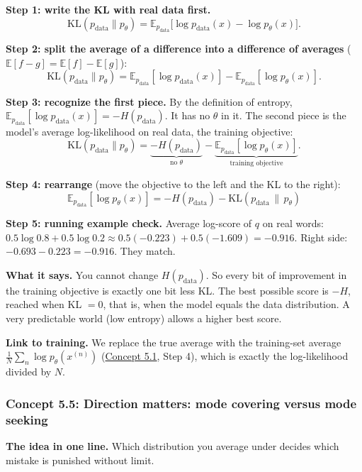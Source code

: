\documentclass[12pt,a4paper]{article}
\begin{document}
\textbf{Step 1: write the KL with real data first.}
\[
\mathrm{KL}(p_{\text{data}}\|p_\theta)=\mathbb{E}_{p_{\text{data}}}\big[\log p_{\text{data}}(x)-\log p_\theta(x)\big].
\]

\textbf{Step 2: split the average of a difference into a difference of averages} ($\mathbb{E}[f-g]=\mathbb{E}[f]-\mathbb{E}[g]$):
\[
\mathrm{KL}(p_{\text{data}}\|p_\theta)=\mathbb{E}_{p_{\text{data}}}[\log p_{\text{data}}(x)]-\mathbb{E}_{p_{\text{data}}}[\log p_\theta(x)].
\]

\textbf{Step 3: recognize the first piece.} By the definition of entropy, $\mathbb{E}_{p_{\text{data}}}[\log p_{\text{data}}(x)]=-H(p_{\text{data}})$. It has no $\theta$ in it. The second piece is the model's average log-likelihood on real data, the training objective:
\[
\mathrm{KL}(p_{\text{data}}\|p_\theta)=\underbrace{-H(p_{\text{data}})}_{\text{no }\theta}-\underbrace{\mathbb{E}_{p_{\text{data}}}[\log p_\theta(x)]}_{\text{training objective}} .
\]

\textbf{Step 4: rearrange} (move the objective to the left and the KL to the right):
\[
\mathbb{E}_{p_{\text{data}}}[\log p_\theta(x)]=-H(p_{\text{data}})-\mathrm{KL}(p_{\text{data}}\,\|\,p_\theta)
\]

\textbf{Step 5: running example check.} Average log-score of $q$ on real words: $0.5\log0.8+0.5\log0.2\approx0.5(-0.223)+0.5(-1.609)=-0.916$. Right side: $-0.693-0.223=-0.916$. They match.

\textbf{What it says.} You cannot change $H(p_{\text{data}})$. So every bit of improvement in the training objective is exactly one bit less KL. The best possible score is $-H$, reached when KL $=0$, that is, when the model equals the data distribution. A very predictable world (low entropy) allows a higher best score.

\textbf{Link to training.} We replace the true average with the training-set average $\frac1N\sum_n\log p_\theta(x^{(n)})$ (\hyperref[c5-1]{Concept 5.1}, Step 4), which is exactly the log-likelihood divided by $N$.

\subsubsection{Concept 5.5: Direction matters: mode covering versus mode seeking}\label{c5-5}

\textbf{The idea in one line.} Which distribution you average under decides which mistake is punished without limit.
\end{document}
